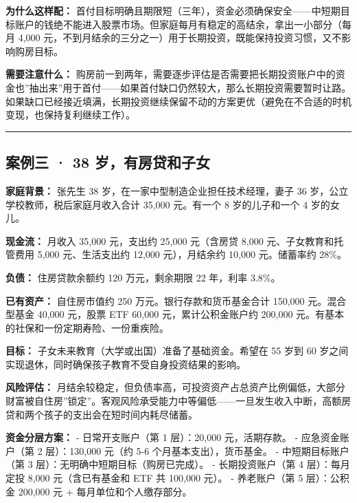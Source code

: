 \documentclass[a4paper,11pt,oneside,fontset=none,UTF8,zihao=-4]{ctexbook}
\begin{document}
\textbf{为什么这样配：}
首付目标明确且期限短（三年），资金必须确保安全------中短期目标账户的钱绝不能进入股票市场。但家庭每月有稳定的高结余，拿出一小部分（每月
4,000
元，不到月结余的三分之一）用于长期投资，既能保持投资习惯，又不影响购房目标。

\textbf{需要注意什么：}
购房前一到两年，需要逐步评估是否需要把长期投资账户中的资金也''抽出来''用于首付------如果首付缺口仍然较大，那么长期投资需要暂时让路。如果缺口已经接近填满，长期投资继续保留不动的方案更优（避免在不合适的时机变现，也保持复利继续工作）。

\begin{center}{\color{dh-bronze}\rule{0.2\textwidth}{0.5pt}}\end{center}

\subsection{案例三 · 38
岁，有房贷和子女}\label{ux6848ux4f8bux4e09-38-ux5c81ux6709ux623fux8d37ux548cux5b50ux5973}

\textbf{家庭背景：} 张先生 38 岁，在一家中型制造企业担任技术经理，妻子
36 岁，公立学校教师，税后家庭月收入合计 35,000 元。有一个 8
岁的儿子和一个 4 岁的女儿。

\textbf{现金流：} 月收入 35,000 元，支出约 25,000 元（含房贷 8,000
元、子女教育和托管费用 5,000 元、生活支出约 12,000 元），月结余约 10,000
元。储蓄率约 28\%。

\textbf{负债：} 住房贷款余额约 120 万元，剩余期限 22 年，利率 3.8\%。

\textbf{已有资产：} 自住房市值约 250 万元。银行存款和货币基金合计
150,000 元。混合型基金 40,000 元，股票 ETF 60,000 元，累计公积金账户约
200,000 元。有基本的社保和一份定期寿险、一份重疾险。

\textbf{目标：} 子女未来教育（大学或出国）准备了基础资金。希望在 55 岁到
60 岁之间实现退休，同时确保孩子教育不受自身投资结果的影响。

\textbf{风险评估：}
月结余较稳定，但负债率高，可投资资产占总资产比例偏低，大部分财富被自住房''锁定''。客观风险承受能力中等偏低------一旦发生收入中断，高额房贷和两个孩子的支出会在短时间内耗尽储蓄。

\textbf{资金分层方案：} - 日常开支账户（第 1 层）：20,000 元，活期存款。
- 应急资金账户（第 2 层）：130,000 元（约 5-6 个月基本支出），货币基金。
- 中短期目标账户（第 3 层）：无明确中短期目标（购房已完成）。 -
长期投资账户（第 4 层）：每月定投 8,000 元（含已有基金和 ETF 共 100,000
元）。 - 养老账户（第 5 层）：公积金 200,000 元 +
每月单位和个人缴存部分。
\end{document}
